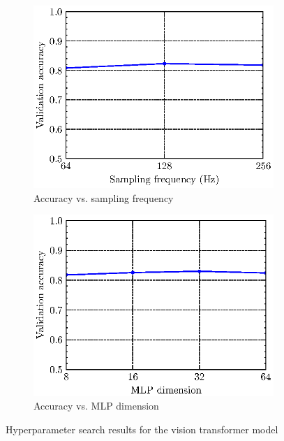 \documentclass[12pt, hidelinks]{article}
\begin{document}
\begin{figure}
\begin{subfigure}[b]{0.45\textwidth}
        \includegraphics[width=\textwidth]{assets/acc_vs_hyperparam/sampling_freq.eps}
        \caption{Accuracy vs. sampling frequency}
        \label{fig:samp_freq_acc}
    \end{subfigure}
    \hfill
    \begin{subfigure}[b]{0.45\textwidth}
        \includegraphics[width=\textwidth]{assets/acc_vs_hyperparam/mlp_dim.eps}
        \caption{Accuracy vs. MLP dimension}
        \label{fig:mlp_dense_layers_acc}
    \end{subfigure}
    \caption{Hyperparameter search results for the vision transformer model}
    \label{fig:model_hyperparameters}
\end{figure}
\end{document}
